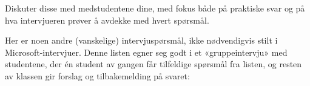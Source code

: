 \vskip 50pt







Diskuter disse med medstudentene dine, med fokus både på praktiske svar og på hva intervjueren prøver å avdekke med hvert spørsmål.







Her er noen andre (vanskelige) intervjuspørsmål, ikke nødvendigvis stilt i Microsoft-intervjuer. Denne listen egner seg godt i et «gruppeintervju» med studentene, der én student av gangen får tilfeldige spørsmål fra listen, og resten av klassen gir forslag og tilbakemelding på svaret:

